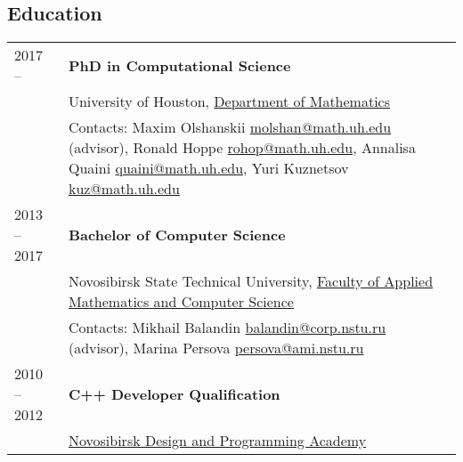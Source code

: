 \documentclass[a4paper,12pt]{article}
\begin{document}
	\subsection*{Education}

	\begin{longtable}{ l >{\raggedright\arraybackslash}p{15cm} }
		2017 --
			& \textbf{PhD in Computational Science}\vspace{1mm}\\
		\phantom{Summer 2018} 
			& University of Houston, \href{http://www.uh.edu/nsm/math/}{Department of Mathematics}\vspace{1mm}\\
			& Contacts: Maxim Olshanskii \href{mailto:molshan@math.uh.edu}{molshan@math.uh.edu} (advisor), Ronald Hoppe \href{m
				ailto:rohop@math.uh.edu}{rohop@math.uh.edu}, 
			Annalisa Quaini \href{mailto:quaini@math.uh.edu}{quaini@math.uh.edu}, Yuri Kuznetsov \href{mailto:kuz@math.uh.edu}{kuz@math.uh.edu}\vspace{3mm}\\
		2013 -- 2017
			& \textbf{Bachelor of Computer Science}\vspace{1mm}\\%
			& Novosibirsk State Technical University, \href{https://en.nstu.ru/education/faculty-of-applied-mathematics-and-computer-science/}{Faculty of Applied Mathematics and Computer Science}\vspace{1mm}\\
			& Contacts: Mikhail Balandin \href{mailto:balandin@corp.nstu.ru}{balandin@corp.nstu.ru} (advisor), Marina Persova \href{mailto:persova@ami.nstu.ru}{persova@ami.nstu.ru}\vspace{3mm}\\
		2010 -- 2012
			& \textbf{C++ Developer Qualification}\vspace{1mm}\\
			& \href{http://www.nadip.ru/}{Novosibirsk Design and Programming Academy}\\
	\end{longtable}
\end{document}
